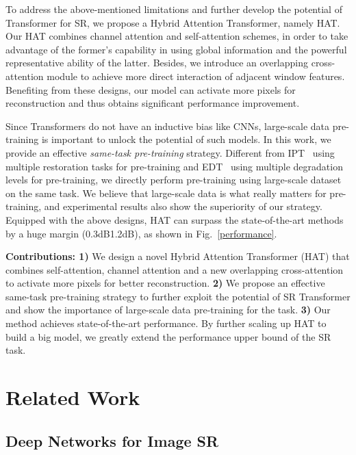 \documentclass[10pt,twocolumn,letterpaper]{article}
\begin{document}
To address the above-mentioned limitations and further develop the potential of Transformer for SR, we propose a Hybrid Attention Transformer, namely HAT. Our HAT combines channel attention and self-attention schemes, in order to take advantage of the former's capability in using global information and the powerful representative ability of the latter. 
Besides, we introduce an overlapping cross-attention module to achieve more direct interaction of adjacent window features. Benefiting from these designs, our model can activate more pixels for reconstruction and thus obtains significant performance improvement.  

Since Transformers do not have an inductive bias like CNNs, large-scale data pre-training is important to unlock the potential of such models. 
In this work, we provide an effective \textit{same-task pre-training} strategy. Different from IPT~\cite{ipt} using multiple restoration tasks for pre-training and EDT~\cite{edt} using multiple degradation levels for pre-training, we directly perform pre-training using large-scale dataset on the same task. We believe that large-scale data is what really matters for pre-training, and experimental results also show the superiority of our strategy. Equipped with the above designs, HAT can surpass the state-of-the-art methods by a huge margin (0.3dB1.2dB), as shown in Fig.~\ref{performance}. 











\textbf{Contributions: 1)} We design a novel Hybrid Attention Transformer (HAT) that combines self-attention, channel attention and a new overlapping cross-attention to activate more pixels for better reconstruction. \textbf{2)} We propose an effective same-task pre-training strategy to further exploit the potential of SR Transformer and show the importance of large-scale data pre-training for the task. \textbf{3)} Our method achieves state-of-the-art performance. By further scaling up HAT to build a big model, we greatly extend the performance upper bound of the SR task. 





\section{Related Work}

\subsection{Deep Networks for Image SR} 
\end{document}
